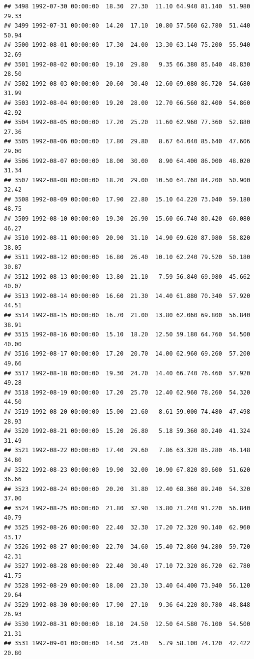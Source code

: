 \documentclass{article}\usepackage{graphicx, color}
\makeatletter
\newenvironment{kframe}{%
 \def\at@end@of@kframe{}%
 \ifinner\ifhmode%
  \def\at@end@of@kframe{\end{minipage}}%
  \begin{minipage}{\columnwidth}%
 \fi\fi%
 \def\FrameCommand##1{\hskip\@totalleftmargin \hskip-\fboxsep
 \colorbox{shadecolor}{##1}\hskip-\fboxsep
     \hskip-\linewidth \hskip-\@totalleftmargin \hskip\columnwidth}%
 \MakeFramed {\advance\hsize-\width
   \@totalleftmargin\z@ \linewidth\hsize
   \@setminipage}}%
 {\par\unskip\endMakeFramed%
 \at@end@of@kframe}
\newenvironment{knitrout}{}{} %
\makeatother
\begin{document}
\begin{knitrout}
\begin{kframe}
\begin{verbatim}
## 3498 1992-07-30 00:00:00  18.30  27.30  11.10 64.940 81.140  51.980  29.33
## 3499 1992-07-31 00:00:00  14.20  17.10  10.80 57.560 62.780  51.440  50.94
## 3500 1992-08-01 00:00:00  17.30  24.00  13.30 63.140 75.200  55.940  32.69
## 3501 1992-08-02 00:00:00  19.10  29.80   9.35 66.380 85.640  48.830  28.50
## 3502 1992-08-03 00:00:00  20.60  30.40  12.60 69.080 86.720  54.680  31.99
## 3503 1992-08-04 00:00:00  19.20  28.00  12.70 66.560 82.400  54.860  42.92
## 3504 1992-08-05 00:00:00  17.20  25.20  11.60 62.960 77.360  52.880  27.36
## 3505 1992-08-06 00:00:00  17.80  29.80   8.67 64.040 85.640  47.606  29.00
## 3506 1992-08-07 00:00:00  18.00  30.00   8.90 64.400 86.000  48.020  31.34
## 3507 1992-08-08 00:00:00  18.20  29.00  10.50 64.760 84.200  50.900  32.42
## 3508 1992-08-09 00:00:00  17.90  22.80  15.10 64.220 73.040  59.180  48.75
## 3509 1992-08-10 00:00:00  19.30  26.90  15.60 66.740 80.420  60.080  46.27
## 3510 1992-08-11 00:00:00  20.90  31.10  14.90 69.620 87.980  58.820  38.05
## 3511 1992-08-12 00:00:00  16.80  26.40  10.10 62.240 79.520  50.180  30.87
## 3512 1992-08-13 00:00:00  13.80  21.10   7.59 56.840 69.980  45.662  40.07
## 3513 1992-08-14 00:00:00  16.60  21.30  14.40 61.880 70.340  57.920  44.51
## 3514 1992-08-15 00:00:00  16.70  21.00  13.80 62.060 69.800  56.840  38.91
## 3515 1992-08-16 00:00:00  15.10  18.20  12.50 59.180 64.760  54.500  40.00
## 3516 1992-08-17 00:00:00  17.20  20.70  14.00 62.960 69.260  57.200  49.66
## 3517 1992-08-18 00:00:00  19.30  24.70  14.40 66.740 76.460  57.920  49.28
## 3518 1992-08-19 00:00:00  17.20  25.70  12.40 62.960 78.260  54.320  44.50
## 3519 1992-08-20 00:00:00  15.00  23.60   8.61 59.000 74.480  47.498  28.93
## 3520 1992-08-21 00:00:00  15.20  26.80   5.18 59.360 80.240  41.324  31.49
## 3521 1992-08-22 00:00:00  17.40  29.60   7.86 63.320 85.280  46.148  34.80
## 3522 1992-08-23 00:00:00  19.90  32.00  10.90 67.820 89.600  51.620  36.66
## 3523 1992-08-24 00:00:00  20.20  31.80  12.40 68.360 89.240  54.320  37.00
## 3524 1992-08-25 00:00:00  21.80  32.90  13.80 71.240 91.220  56.840  40.79
## 3525 1992-08-26 00:00:00  22.40  32.30  17.20 72.320 90.140  62.960  43.17
## 3526 1992-08-27 00:00:00  22.70  34.60  15.40 72.860 94.280  59.720  42.31
## 3527 1992-08-28 00:00:00  22.40  30.40  17.10 72.320 86.720  62.780  41.75
## 3528 1992-08-29 00:00:00  18.00  23.30  13.40 64.400 73.940  56.120  29.64
## 3529 1992-08-30 00:00:00  17.90  27.10   9.36 64.220 80.780  48.848  26.93
## 3530 1992-08-31 00:00:00  18.10  24.50  12.50 64.580 76.100  54.500  21.31
## 3531 1992-09-01 00:00:00  14.50  23.40   5.79 58.100 74.120  42.422  20.80

\end{verbatim}
\end{kframe}
\end{knitrout}
\end{document}
